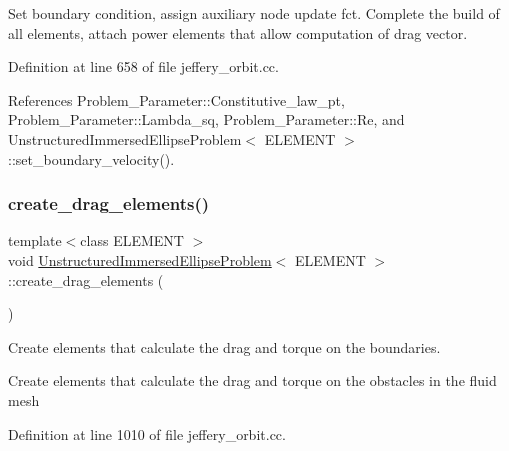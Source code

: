 Set boundary condition, assign auxiliary node update fct. Complete the build of all elements, attach power elements that allow computation of drag vector. 



Definition at line 658 of file jeffery\+\_\+orbit.\+cc.



References Problem\+\_\+\+Parameter\+::\+Constitutive\+\_\+law\+\_\+pt, Problem\+\_\+\+Parameter\+::\+Lambda\+\_\+sq, Problem\+\_\+\+Parameter\+::\+Re, and Unstructured\+Immersed\+Ellipse\+Problem$<$ E\+L\+E\+M\+E\+N\+T $>$\+::set\+\_\+boundary\+\_\+velocity().

\mbox{\label{classUnstructuredImmersedEllipseProblem_a16a7c6022867f709ebdd59b8fee2004a}} 
\subsubsection{\texorpdfstring{create\+\_\+drag\+\_\+elements()}{create\_drag\_elements()}}
{\footnotesize\ttfamily template$<$class E\+L\+E\+M\+E\+NT $>$ \\
void \hyperlink{classUnstructuredImmersedEllipseProblem}{Unstructured\+Immersed\+Ellipse\+Problem}$<$ E\+L\+E\+M\+E\+NT $>$\+::create\+\_\+drag\+\_\+elements (\begin{DoxyParamCaption}{ }\end{DoxyParamCaption})\hspace{0.3cm}{\ttfamily [private]}}



Create elements that calculate the drag and torque on the boundaries. 

Create elements that calculate the drag and torque on the obstacles in the fluid mesh 

Definition at line 1010 of file jeffery\+\_\+orbit.\+cc.

\mbox{\label{classUnstructuredImmersedEllipseProblem_a3b4a4e279a11b37d79d040b348008765}} 
